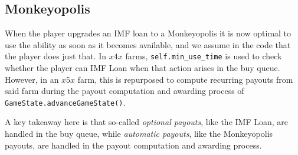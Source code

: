 \documentclass[12pt,letterpaper]{article}
\theoremstyle{remark}
\theoremstyle{plain}
\begin{document}
\subsection{Monkeyopolis}

When the player upgrades an IMF loan to a Monkeyopolis it is now optimal to use the ability as soon as it becomes available, and we assume in the code that the player does just that. In $x4x$ farms, \texttt{self.min\_use\_time} is used to check whether the player can IMF Loan when that action arises in the buy queue. However, in an $x5x$ farm, this is repurposed to compute recurring payouts from said farm during the payout computation and awarding process of \texttt{GameState.advanceGameState()}.

A key takeaway here is that so-called \textit{optional payouts}, like the IMF Loan, are handled in the buy queue, while \textit{automatic payouts}, like the Monkeyopolis payouts, are handled in the payout computation and awarding process.
\end{document}
